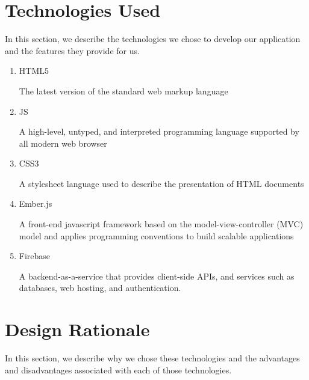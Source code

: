 \section{Technologies Used}
In this section, we describe the technologies we chose to develop our application and the features they provide for us.

\begin{enumerate}
\item HTML5 \par The latest version of the standard web markup language
\item JS \par A high-level, untyped, and interpreted programming  language supported by all modern web browser
\item CSS3 \par A stylesheet language used to describe the presentation of HTML documents
\item Ember.js \par A front-end javascript framework based on the model-view-controller (MVC) model and applies programming conventions to build scalable applications
\item  Firebase \par A backend-as-a-service that provides client-side APIs, and services such as databases, web hosting, and authentication.
\end{enumerate}

\section{Design Rationale}
In this section, we describe why we chose these technologies and the advantages and disadvantages associated with each of those technologies. 

